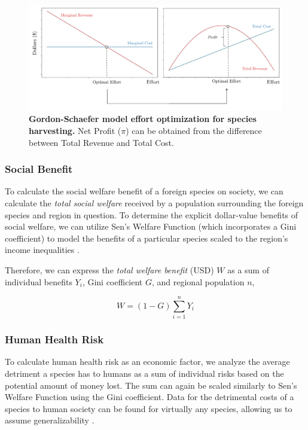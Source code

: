 \begin{figure}[h!]
\centering
    \includegraphics[scale=0.65]{figures/gordonschaefer.pdf}
    \captionsetup{width=0.9\textwidth}
    \caption{\textbf{Gordon-Schaefer model effort optimization for species harvesting.} Net Profit (\(\pi\)) can be obtained from the difference between Total Revenue and Total Cost.}
    \label{fig:gordonschafer}
\end{figure}

\subsubsection{Social Benefit}

To calculate the social welfare benefit of a foreign species on society, we can calculate the \textit{total social welfare} received by a population surrounding the foreign species and region in question. To determine the explicit dollar-value benefits of social welfare, we can utilize Sen's Welfare Function (which incorporates a Gini coefficient) to model the benefits of a particular species scaled to the region's income inequalities \cite{wikipediaSocialWelfare, worldbankWorldBank}. 

Therefore, we can express the \textit{total welfare benefit} (USD) \(W\) as a sum of individual benefits \(Y_i\), Gini coefficient \(G\), and regional population \(n\),

\begin{equation}
    W = (1 - G) \sum_{i=1}^n Y_i
\end{equation}

\subsubsection{Human Health Risk}

To calculate human health risk as an economic factor, we analyze the average detriment a species has to humans as a sum of individual risks based on the potential amount of money lost. The sum can again be scaled similarly to Sen's Welfare Function using the Gini coefficient. Data for the detrimental costs of a species to human society can be found for virtually any species, allowing us to assume generalizability \cite{fmrInvasiveSpecies}.

